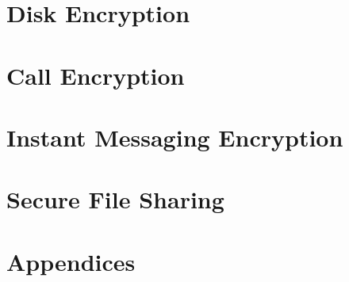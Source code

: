 \documentclass[oribibl,a4paper]{book}
\begin{document}
\chapter{Disk Encryption}

\clearpage

\clearpage

\clearpage

\clearpage
\graphicspath{{./chapter_11_call_encryption/}}
\chapter{Call Encryption}

\clearpage
\graphicspath{{./chapter_12_instant_messaging_encryption/}}
\chapter{Instant Messaging Encryption}

\clearpage
\graphicspath{{./chapter_13_secure_file_sharing/}}
\chapter{Secure File Sharing}

\clearpage
\graphicspath{{./chapter_14_appendices/}}
\chapter{Appendices}
\appendix

\clearpage

\clearpage

\clearpage
\end{document}
